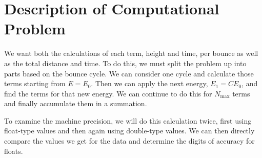 \documentclass[aps,prl,twocolumn,superscriptaddress]{revtex4-1}
\begin{document}
\section{Description of Computational Problem}
We want both the calculations of each term, height and time, per bounce as well as the total distance and time. To do this, we must split the problem up into parts based on the bounce cycle. We can consider one cycle and calculate those terms starting from $E = E_0$. Then we can apply the next energy, $E_1 = C E_0$, and find the terms for that new energy. We can continue to do this for $N_{\text{max}}$ terms and finally accumulate them in a summation.

To examine the machine precision, we will do this calculation twice, first using float-type values and then again using double-type values. We can then directly compare the values we get for the data and determine the digits of accuracy for floats.
\end{document}

